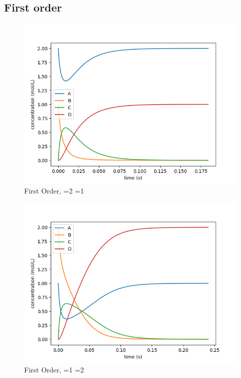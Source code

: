 \documentclass{article}
\begin{document}
\subsection{First order}
\begin{figure}[H]
\centering
\includegraphics[scale=0.6]{2. first 2 1.png}
\caption{First Order, =2 =1}
\end{figure}
\begin{figure}[H]
\centering
\includegraphics[scale=0.6]{2. first 1 2.png}
\caption{First Order, =1 =2}
\end{figure}
\end{document}
